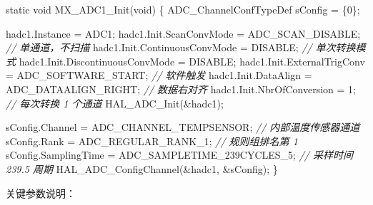 \documentclass[
  chinese,
  UTF8,
  oneside,
  openany]{ctexbook}
\newenvironment{Shaded}{}{}
\newcommand{\CommentTok}[1]{\textcolor[rgb]{0.38,0.63,0.69}{\textit{#1}}}
\newcommand{\DataTypeTok}[1]{\textcolor[rgb]{0.56,0.13,0.00}{#1}}
\newcommand{\DecValTok}[1]{\textcolor[rgb]{0.25,0.63,0.44}{#1}}
\newcommand{\NormalTok}[1]{#1}
\newcommand{\OperatorTok}[1]{\textcolor[rgb]{0.40,0.40,0.40}{#1}}
\begin{document}
\begin{Shaded}
\begin{Highlighting}[]
\DataTypeTok{static} \DataTypeTok{void}\NormalTok{ MX\_ADC1\_Init}\OperatorTok{(}\DataTypeTok{void}\OperatorTok{)}
\OperatorTok{\{}
\NormalTok{    ADC\_ChannelConfTypeDef sConfig }\OperatorTok{=} \OperatorTok{\{}\DecValTok{0}\OperatorTok{\};}

\NormalTok{    hadc1}\OperatorTok{.}\NormalTok{Instance }\OperatorTok{=}\NormalTok{ ADC1}\OperatorTok{;}
\NormalTok{    hadc1}\OperatorTok{.}\NormalTok{Init}\OperatorTok{.}\NormalTok{ScanConvMode }\OperatorTok{=}\NormalTok{ ADC\_SCAN\_DISABLE}\OperatorTok{;}        \CommentTok{// 单通道，不扫描}
\NormalTok{    hadc1}\OperatorTok{.}\NormalTok{Init}\OperatorTok{.}\NormalTok{ContinuousConvMode }\OperatorTok{=}\NormalTok{ DISABLE}\OperatorTok{;}           \CommentTok{// 单次转换模式}
\NormalTok{    hadc1}\OperatorTok{.}\NormalTok{Init}\OperatorTok{.}\NormalTok{DiscontinuousConvMode }\OperatorTok{=}\NormalTok{ DISABLE}\OperatorTok{;}
\NormalTok{    hadc1}\OperatorTok{.}\NormalTok{Init}\OperatorTok{.}\NormalTok{ExternalTrigConv }\OperatorTok{=}\NormalTok{ ADC\_SOFTWARE\_START}\OperatorTok{;}  \CommentTok{// 软件触发}
\NormalTok{    hadc1}\OperatorTok{.}\NormalTok{Init}\OperatorTok{.}\NormalTok{DataAlign }\OperatorTok{=}\NormalTok{ ADC\_DATAALIGN\_RIGHT}\OperatorTok{;}        \CommentTok{// 数据右对齐}
\NormalTok{    hadc1}\OperatorTok{.}\NormalTok{Init}\OperatorTok{.}\NormalTok{NbrOfConversion }\OperatorTok{=} \DecValTok{1}\OperatorTok{;}                    \CommentTok{// 每次转换 1 个通道}
\NormalTok{    HAL\_ADC\_Init}\OperatorTok{(\&}\NormalTok{hadc1}\OperatorTok{);}

\NormalTok{    sConfig}\OperatorTok{.}\NormalTok{Channel }\OperatorTok{=}\NormalTok{ ADC\_CHANNEL\_TEMPSENSOR}\OperatorTok{;}          \CommentTok{// 内部温度传感器通道}
\NormalTok{    sConfig}\OperatorTok{.}\NormalTok{Rank }\OperatorTok{=}\NormalTok{ ADC\_REGULAR\_RANK\_1}\OperatorTok{;}                 \CommentTok{// 规则组排名第 1}
\NormalTok{    sConfig}\OperatorTok{.}\NormalTok{SamplingTime }\OperatorTok{=}\NormalTok{ ADC\_SAMPLETIME\_239CYCLES\_5}\OperatorTok{;} \CommentTok{// 采样时间 239.5 周期}
\NormalTok{    HAL\_ADC\_ConfigChannel}\OperatorTok{(\&}\NormalTok{hadc1}\OperatorTok{,} \OperatorTok{\&}\NormalTok{sConfig}\OperatorTok{);}
\OperatorTok{\}}
\end{Highlighting}
\end{Shaded}

关键参数说明：
\end{document}

